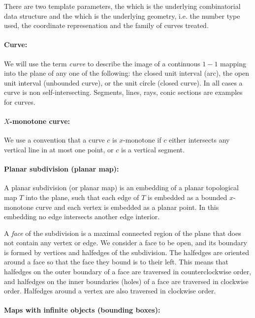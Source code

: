    There are two template parameters, the  which is the
   underlying combinatorial data structure and the  which
   is the underlying geometry, i.e. the number type used, the
   coordinate represenation and the family of curves treated.

\paragraph{Curve:}
We will use the term {\it curve} to describe the image of a continuous
$1\!\!-\!\!1$ mapping into the plane of any one of the following: the
closed unit interval (arc), the open unit interval (unbounded curve),
or the unit circle (closed curve). In all cases a curve is non
self-intersecting. Segments, lines, rays, conic sections are examples for curves.

\paragraph{$X$-monotone curve:}
We
use a convention
that a curve $c$ is $x$-monotone if $c$ either intersects 
any vertical line in at most one point, or $c$ is a vertical
segment. 

\paragraph{Planar subdivision (planar map):}
A planar subdivision (or planar map) is an embedding of a planar 
topological map $T$ 
into the plane, such that each edge of $T$ is embedded as a
bounded $x$-monotone curve and each vertex is embedded as a planar point.
In this embedding no
edge intersects another edge interior.

A {\em face} of the subdivision is a maximal connected region of the
plane that does not contain any vertex or edge. 
We consider a face to be open, and its boundary is
formed by vertices and halfedges of the subdivision.
The halfedges are oriented around a face so that the face they bound
is to their left. This means that halfedges on the outer boundary
of a face are traversed in counterclockwise order, and halfedges on the inner
boundaries (holes) of a face are traversed in clockwise order. Halfedges 
around a vertex are also traversed in clockwise order. 

\paragraph{Maps with infinite objects (bounding boxes):}

